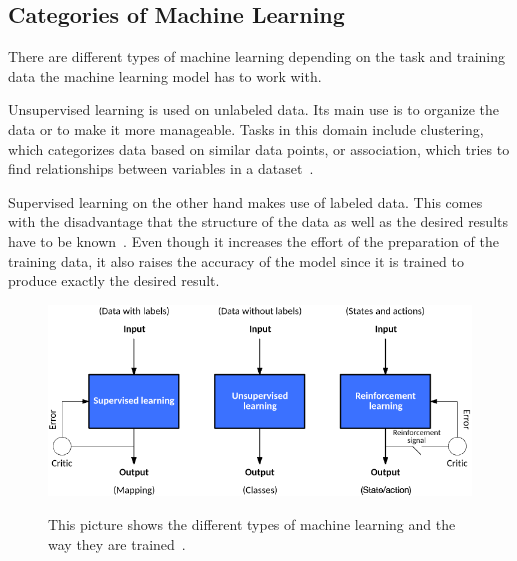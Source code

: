 
\subsection{Categories of Machine Learning}
There are different types of machine learning depending on the task and training data the machine learning model has to work with.

Unsupervised learning is used on unlabeled data. Its main use is to organize the data or to make it more manageable. Tasks in this domain include clustering, which categorizes data based on similar data points, or association, which tries to find relationships between variables in a dataset~\cite{supervised-unsupervised-learning}.

Supervised learning on the other hand makes use of labeled data. This comes with the disadvantage that the structure of the data as well as the desired results have to be known~\cite{classical-ml}. Even though it increases the effort of the preparation of the training data, it also raises the accuracy of the model since it is trained to produce exactly the desired result.



\begin{figure}[ht]
  \caption[Different kinds of machine learning]{This picture shows the different types of machine learning and the way they are trained~\cite{types-of-ml}.} %
  \centering
  \includegraphics[width=\linewidth]{img/types_of_machine_learning.png}\label{fig:kinds_of_ml}
\end{figure}

